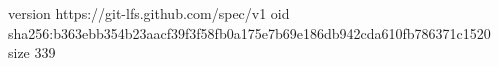 version https://git-lfs.github.com/spec/v1
oid sha256:b363ebb354b23aacf39f3f58fb0a175e7b69e186db942cda610fb786371c1520
size 339

